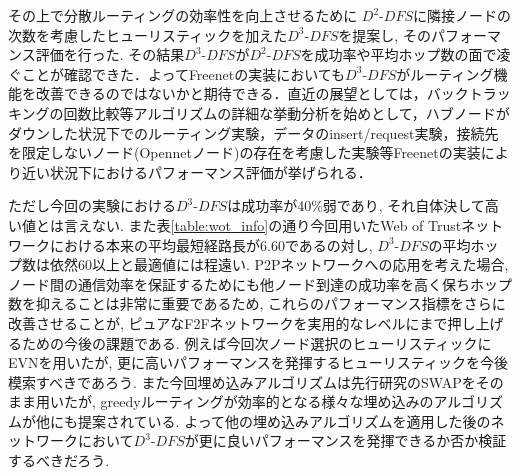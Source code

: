 \documentclass[technicalreport]{./ieicej-v3.0/UTF/ieicej}
\begin{document}
その上で分散ルーティングの効率性を向上させるために $D^2$-$DFS$に隣接ノードの次数を考慮したヒューリスティックを加えた$D^3$-$DFS$を提案し, そのパフォーマンス評価を行った. その結果$D^3$-$DFS$が$D^2$-$DFS$を成功率や平均ホップ数の面で凌ぐことが確認できた．よってFreenetの実装においても$D^3$-$DFS$がルーティング機能を改善できるのではないかと期待できる．直近の展望としては，バックトラッキングの回数比較等アルゴリズムの詳細な挙動分析を始めとして，ハブノードがダウンした状況下でのルーティング実験，データのinsert/request実験，接続先を限定しないノード(Opennetノード)の存在を考慮した実験等Freenetの実装により近い状況下におけるパフォーマンス評価が挙げられる．

ただし今回の実験における$D^3$-$DFS$は成功率が40\%弱であり, それ自体決して高い値とは言えない. また表\ref{table:wot_info}の通り今回用いたWeb of Trustネットワークにおける本来の平均最短経路長が6.60であるの対し, $D^3$-$DFS$の平均ホップ数は依然60以上と最適値には程遠い. P2Pネットワークへの応用を考えた場合, ノード間の通信効率を保証するためにも他ノード到達の成功率を高く保ちホップ数を抑えることは非常に重要であるため, これらのパフォーマンス指標をさらに改善させることが, ピュアなF2Fネットワークを実用的なレベルにまで押し上げるための今後の課題である. 例えば今回次ノード選択のヒューリスティックにEVNを用いたが, 更に高いパフォーマンスを発揮するヒューリスティックを今後模索すべきであろう. また今回埋め込みアルゴリズムは先行研究のSWAPをそのまま用いたが, greedyルーティングが効率的となる様々な埋め込みのアルゴリズムが他にも提案されている. よって他の埋め込みアルゴリズムを適用した後のネットワークにおいて$D^3$-$DFS$が更に良いパフォーマンスを発揮できるか否か検証するべきだろう.


\end{document}
